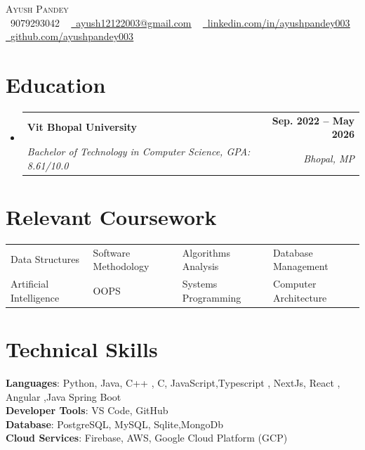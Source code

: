 \documentclass[letterpaper,10.9pt]{article}
\makeatletter
\newcommand{\resumeSubheading}[4]{
  \vspace{-2pt}\item
    \begin{tabular*}{1.0\textwidth}[t]{l@{\extracolsep{\fill}}r}
      \textbf{#1} & \textbf{\small #2} \\
      \textit{\small#3} & \textit{\small #4} \\
    \end{tabular*}\vspace{-7pt}
}
\newcommand{\resumeSubHeadingListStart}{\begin{itemize}[leftmargin=0.0in, label={}]}
\newcommand{\resumeSubHeadingListEnd}{\end{itemize}}
\makeatother
\begin{document}
\begin{center}
    {\Huge \scshape Ayush Pandey} \\ \vspace{1pt}
    \small \raisebox{-0.1\height}\faPhone\ 9079293042 ~ \href{mailto:ayush12122003@gmail.com}{\raisebox{-0.2\height}\faEnvelope\  \underline{ayush12122003@gmail.com}} ~ 
    \href{https://linkedin.com/in/ayushpandey003}{\raisebox{-0.2\height}\faLinkedin\ \underline{linkedin.com/in/ayushpandey003}}  ~
    \href{https://github.com/ayushpandey003}{\raisebox{-0.2\height}\faGithub\ \underline{github.com/ayushpandey003}}
    \vspace{-8pt}
\end{center}

\section{Education}
  \resumeSubHeadingListStart
    \resumeSubheading
      {Vit Bhopal University}{Sep. 2022 -- May 2026}
      {Bachelor of Technology in Computer Science, GPA: 8.61/10.0}{Bhopal, MP}
  \resumeSubHeadingListEnd


\vspace{-13pt}
\section{Relevant Coursework}
\begin{tabularx}{\textwidth}{X X X X}
    Data Structures & Software Methodology & Algorithms Analysis & Database Management \\
    Artificial Intelligence & OOPS & Systems Programming & Computer Architecture \\
\end{tabularx}
\vspace{-18pt}
\section{Technical Skills}
 \begin{itemize}[leftmargin=0.15in, label={}]
    \small{\item{
     \textbf{Languages}{: Python, Java, C++ , C, JavaScript,Typescript , NextJs, React , Angular ,Java Spring Boot } \\
     \textbf{Developer Tools}{: VS Code, GitHub} \\
     \textbf{Database}{: PostgreSQL, MySQL, Sqlite,MongoDb} \\
     \textbf{Cloud Services}{: Firebase, AWS, Google Cloud Platform (GCP)} \\
    }}
 \end{itemize}
 \vspace{-18pt}
\end{document}
